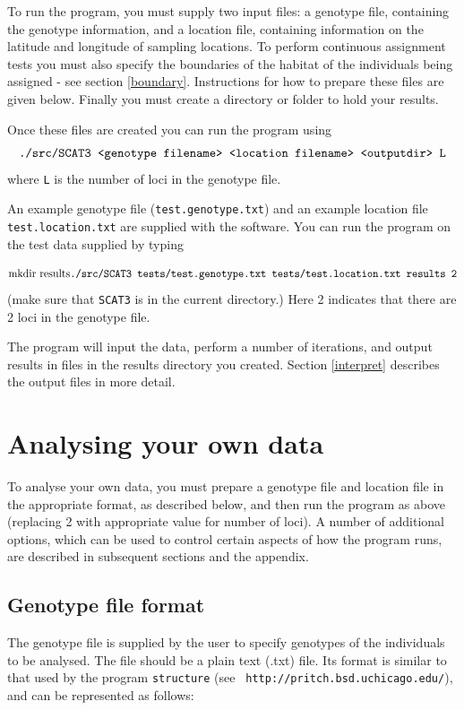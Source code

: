\documentclass[11pt,titlepage,times,letterpaper]{article}
\begin{document}
To run the program, you must supply two input files: a genotype file,
containing the genotype information, and a location file, containing
information on the latitude and longitude of sampling locations. To
perform continuous assignment tests you must also specify the
boundaries of the habitat of the individuals being assigned - see
section \ref{boundary}.  Instructions for how to prepare these files
are given below. Finally you must create a directory or folder to hold your results.

Once these files are created you can run the program
using
$$\text{{\tt ./src/SCAT3 <genotype filename> <location filename> <outputdir> L}}$$ where {\tt L} is the number of loci in the genotype file.

An example genotype file ({\tt test.genotype.txt})
and an example location file {\tt test.location.txt} are supplied with
the software.  You can run the program on the test data supplied by
typing

$$ \text{mkdir results}\\
\text{{\tt ./src/SCAT3 tests/test.genotype.txt tests/test.location.txt results 2}}$$ 
(make sure that {\tt SCAT3} is in the current directory.)  Here 2 indicates that there are 2
loci in the genotype file.

The program will input the data, perform a number of iterations, and
output results in files in the results directory you created. 
Section \ref{interpret} describes the output files in more detail.

\section{Analysing your own data}

To analyse your own data, you must prepare a genotype file and
location file in the appropriate format, as described below, and then
run the program as above (replacing 2 with appropriate value for
number of loci). A number of additional options, which
can be used to control certain aspects of how the program runs, are
described in subsequent sections and the appendix.

\subsection{Genotype file format}
\label{inputfile}

The genotype file is supplied by the user to specify genotypes of the
individuals to be analysed. The file should be a plain text (.txt) file.
Its format is similar to that
used by the program {\tt structure} (see {\tt
http://pritch.bsd.uchicago.edu/}), and can be represented as follows:
\end{document}

